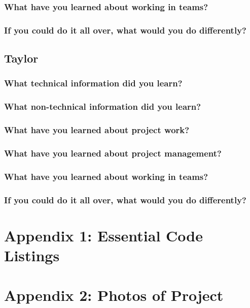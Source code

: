 \documentclass[onecolumn, draftclsnofoot,10pt, compsoc]{IEEEtran}
\begin{document}
\subsubsection{What have you learned about working in teams?}

\subsubsection{If you could do it all over, what would you do differently?}

\subsection{Taylor}

\subsubsection{What technical information did you learn?}

\subsubsection{What non-technical information did you learn?}

\subsubsection{What have you learned about project work?}

\subsubsection{What have you learned about project management?}

\subsubsection{What have you learned about working in teams?}

\subsubsection{If you could do it all over, what would you do differently?}


\newpage
\section{Appendix 1: Essential Code Listings}

\newpage
\section{Appendix 2: Photos of Project}
\end{document}
